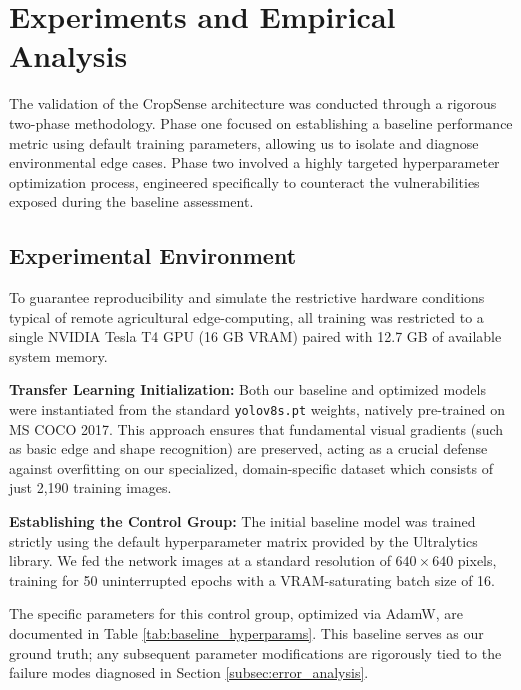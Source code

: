 \section{Experiments and Empirical Analysis}
\label{sec:experiments}

The validation of the CropSense architecture was conducted through a rigorous two-phase methodology. Phase one focused on establishing a baseline performance metric using default training parameters, allowing us to isolate and diagnose environmental edge cases. Phase two involved a highly targeted hyperparameter optimization process, engineered specifically to counteract the vulnerabilities exposed during the baseline assessment.

\subsection{Experimental Environment}
\label{subsec:exp_setup}

To guarantee reproducibility and simulate the restrictive hardware conditions typical of remote agricultural edge-computing, all training was restricted to a single NVIDIA Tesla T4 GPU (16 GB VRAM) paired with 12.7 GB of available system memory.

\textbf{Transfer Learning Initialization:} Both our baseline and optimized models were instantiated from the standard \texttt{yolov8s.pt} weights, natively pre-trained on MS COCO 2017. This approach ensures that fundamental visual gradients (such as basic edge and shape recognition) are preserved, acting as a crucial defense against overfitting on our specialized, domain-specific dataset which consists of just 2,190 training images.

\textbf{Establishing the Control Group:} The initial baseline model was trained strictly using the default hyperparameter matrix provided by the Ultralytics library. We fed the network images at a standard resolution of $640 \times 640$ pixels, training for 50 uninterrupted epochs with a VRAM-saturating batch size of 16.

The specific parameters for this control group, optimized via AdamW, are documented in Table \ref{tab:baseline_hyperparams}. This baseline serves as our ground truth; any subsequent parameter modifications are rigorously tied to the failure modes diagnosed in Section \ref{subsec:error_analysis}.


